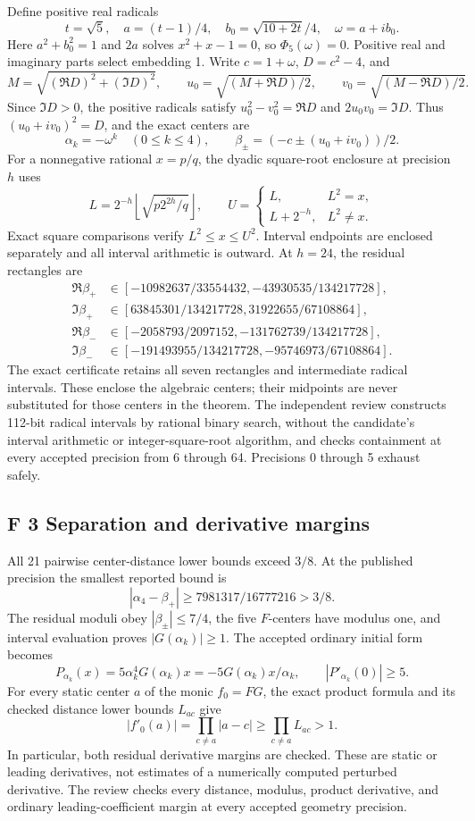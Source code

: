 \documentclass[
  11pt,
]{article}
\begin{document}
Define positive real radicals
\[
t=\sqrt5,\quad a=(t-1)/4,\quad b_0=\sqrt{10+2t}/4,
\quad \omega=a+i b_0.
\]
Here \(a^2+b_0^2=1\) and \(2a\) solves \(x^2+x-1=0\), so
\(\Phi_5(\omega)=0\). Positive real and imaginary parts select
embedding 1. Write \(c=1+\omega\), \(D=c^2-4\), and
\[
M=\sqrt{(\Re D)^2+(\Im D)^2},\qquad
u_0=\sqrt{(M+\Re D)/2},\qquad v_0=\sqrt{(M-\Re D)/2}.
\]
Since \(\Im D>0\), the positive radicals satisfy
\(u_0^2-v_0^2=\Re D\) and \(2u_0v_0=\Im D\). Thus
\((u_0+i v_0)^2=D\), and the exact centers are
\[
\alpha_k=-\omega^k\quad(0\leq k\leq4),\qquad
\beta_\pm=(-c\pm(u_0+i v_0))/2. \tag{F3}
\]
For a nonnegative rational \(x=p/q\), the dyadic square-root enclosure at
precision \(h\) uses
\[
L=2^{-h}\left\lfloor\sqrt{p2^{2h}/q}\right\rfloor,\qquad
U=\begin{cases}L,&L^2=x,\\L+2^{-h},&L^2\ne x.\end{cases}
\]
Exact square comparisons verify \(L^2\leq x\leq U^2\).
Interval endpoints are enclosed separately and all interval arithmetic is
outward. At \(h=24\), the residual rectangles are
\begin{align*}
\Re\beta_+&\in[-10982637/33554432,-43930535/134217728],\\
\Im\beta_+&\in[63845301/134217728,31922655/67108864],\\
\Re\beta_-&\in[-2058793/2097152,-131762739/134217728],\\
\Im\beta_-&\in[-191493955/134217728,-95746973/67108864].
\end{align*}
The exact certificate retains all seven rectangles and intermediate
radical intervals. These enclose the algebraic centers; their midpoints
are never substituted for those centers in the theorem. The independent
review constructs 112-bit radical intervals by rational binary search,
without the candidate's interval arithmetic or integer-square-root
algorithm, and checks containment at every accepted precision from 6
through 64. Precisions 0 through 5 exhaust safely.

\subsection{F 3 Separation and derivative margins}

All 21 pairwise center-distance lower bounds exceed \(3/8\). At the
published precision the smallest reported bound is
\[
|\alpha_4-\beta_+|\geq7981317/16777216>3/8. \tag{F4}
\]
The residual moduli obey \(|\beta_\pm|\leq7/4\), the five
\(F\)-centers have modulus one, and interval evaluation proves
\(|G(\alpha_k)|\geq1\). The accepted ordinary initial form becomes
\[
P_{\alpha_k}(x)=5\alpha_k^4G(\alpha_k)x
=-5G(\alpha_k)x/\alpha_k,\qquad |P'_{\alpha_k}(0)|\geq5.
\tag{F5}
\]
For every static center \(a\) of the monic \(f_0=FG\), the exact
product formula and its checked distance lower bounds \(L_{ac}\) give
\[
|f'_0(a)|=\prod_{c\ne a}|a-c|\geq\prod_{c\ne a}L_{ac}>1.
\tag{F6}
\]
In particular, both residual derivative margins are checked. These are
static or leading derivatives, not estimates of a numerically computed
perturbed derivative. The review checks every distance, modulus, product
derivative, and ordinary leading-coefficient margin at every accepted
geometry precision.
\end{document}
